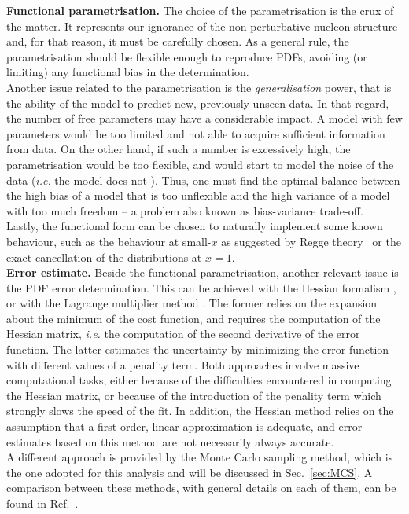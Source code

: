 \textbf{Functional parametrisation.} The choice of the parametrisation is the crux of the matter. It represents our ignorance of the non-perturbative nucleon structure and, for that reason, it must be carefully chosen. As a general rule, the parametrisation should be flexible enough to reproduce PDFs, avoiding (or limiting) any functional bias in the determination. 
\\[6pt]
Another issue related to the parametrisation is the \textit{generalisation} power, that is the ability of the model to predict new, previously unseen data. In that regard, the number of free parameters may have a considerable impact. A model with few parameters would be too limited and not able to acquire sufficient information from data. On the other hand, if such a number is excessively high, the parametrisation would be too flexible, and would start to model the noise of the data (\textit{i.e.} the model does not ). Thus, one must find the optimal balance between the high bias of a model that is too unflexible and the high variance of a model with too much freedom -- a problem also known as bias-variance trade-off.
\\[6pt]
Lastly, the functional form can be chosen to naturally implement some known behaviour, such as the behaviour at small-$x$ as suggested by Regge theory~\cite{Close:1994he} or the exact cancellation of the distributions at $x=1$.
\endgroup
\\[10pt]
\begingroup
\textbf{Error estimate.} Beside the functional parametrisation, another relevant issue is the PDF error determination. This can be achieved with the Hessian formalism \cite{Pumplin:2001ct}, or with the Lagrange multiplier method \cite{Stump:2001gu}. The former relies on the expansion about the minimum of the cost function, and requires the computation of the Hessian matrix, \textit{i.e.} the computation of the second derivative of the error function. The latter estimates the uncertainty by minimizing the error function with different values of a penality term. Both approaches involve massive computational tasks, either because of the difficulties encountered in computing the Hessian matrix, or because of the introduction of the penality term which strongly slows the speed of the fit. In addition, the Hessian method relies on the assumption that a first order, linear approximation is adequate, and error estimates based on this method are not necessarily always accurate.
\\[6pt]
A different approach is provided by the Monte Carlo sampling method, which is the one adopted for this analysis and will be discussed in Sec.~\ref{sec:MCS}. A comparison between these methods, with general details on each of them, can be found in Ref.~\cite{Forte:2010dt}.
\endgroup
\\[10pt]

